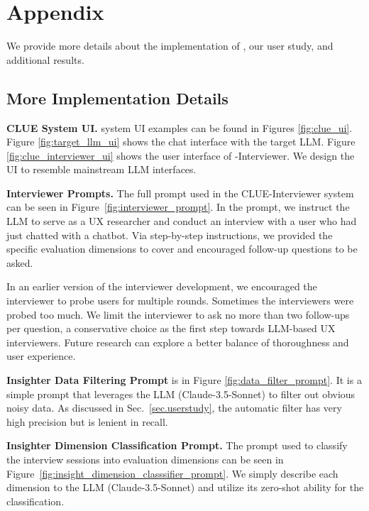 \newpage







\section{Appendix}
We provide more details about the implementation of \method{}, our user study, and additional results.

\subsection{More Implementation Details}
\label{app.implementation}

\textbf{CLUE System UI.} \method{} system UI examples can be found in Figures \ref{fig:clue_ui}. Figure \ref{fig:target_llm_ui} shows the chat interface with the target LLM. Figure \ref{fig:clue_interviewer_ui} shows the user interface of \method-Interviewer.
We design the UI to resemble mainstream LLM interfaces.


\textbf{Interviewer Prompts.} The full prompt used in the CLUE-Interviewer system can be seen in Figure~\ref{fig:interviewer_prompt}. In the prompt, we instruct the LLM to serve as a UX researcher and conduct an interview with a user who had just chatted with a chatbot. Via step-by-step instructions, we provided the specific evaluation dimensions to cover and encouraged follow-up questions to be asked. 

In an earlier version of the interviewer development, we encouraged the interviewer to probe users for multiple rounds. Sometimes the interviewers were probed too much. We limit the interviewer to ask no more than two follow-ups per question, a conservative choice as the first step towards LLM-based UX interviewers. Future research can explore a better balance of thoroughness and user experience.



\textbf{Insighter Data Filtering Prompt} is in Figure \ref{fig:data_filter_prompt}. It is a simple prompt that leverages the LLM (Claude-3.5-Sonnet) to filter out obvious noisy data. As discussed in Sec.~\ref{sec.userstudy}, the automatic filter has very high precision but is lenient in recall.

\textbf{Insighter Dimension Classification Prompt.} The prompt used to classify the interview sessions into evaluation dimensions can be seen in Figure~\ref{fig:insight_dimension_classsifier_prompt}. We simply describe each dimension to the LLM (Claude-3.5-Sonnet) and utilize its zero-shot ability for the classification.

